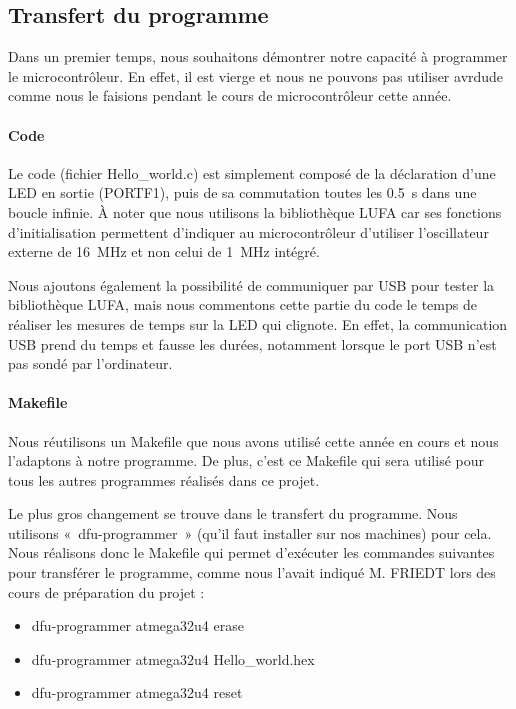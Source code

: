 \documentclass[12pt, a4paper, titlepage]{article}
\begin{document}
\subsection{Transfert du programme}

Dans un premier temps, nous souhaitons démontrer notre capacité à programmer le microcontrôleur. En effet, il est vierge et nous ne pouvons pas utiliser avrdude comme nous le faisions pendant le cours de microcontrôleur cette année.

\paragraph{Code}

Le code (fichier Hello\_world.c) est simplement composé de la déclaration d'une LED en sortie (PORTF1), puis de sa commutation toutes les \SI{0.5}{\second} dans une boucle infinie. À noter que nous utilisons la bibliothèque LUFA car ses fonctions d'initialisation permettent d'indiquer au microcontrôleur d'utiliser l'oscillateur externe de \SI{16}{\mega\hertz} et non celui de \SI{1}{\mega\hertz} intégré.

Nous ajoutons également la possibilité de communiquer par USB pour tester la bibliothèque LUFA, mais nous commentons cette partie du code le temps de réaliser les mesures de temps sur la LED qui clignote. En effet, la communication USB prend du temps et fausse les durées, notamment lorsque le port USB n'est pas sondé par l'ordinateur.

\paragraph{Makefile}

Nous réutilisons un Makefile que nous avons utilisé cette année en cours et nous l'adaptons à notre programme. De plus, c'est ce Makefile qui sera utilisé pour tous les autres programmes réalisés dans ce projet.

Le plus gros changement se trouve dans le transfert du programme. Nous utilisons «~dfu-programmer~» (qu'il faut installer sur nos machines) pour cela. Nous réalisons donc le Makefile qui permet d'exécuter les commandes suivantes pour transférer le programme, comme nous l'avait indiqué M. FRIEDT lors des cours de préparation du projet : \nopagebreak
\begin{itemize}
	\item dfu-programmer atmega32u4 erase
	\item dfu-programmer atmega32u4 Hello\_world.hex
	\item dfu-programmer atmega32u4 reset
\end{itemize}
\end{document}
